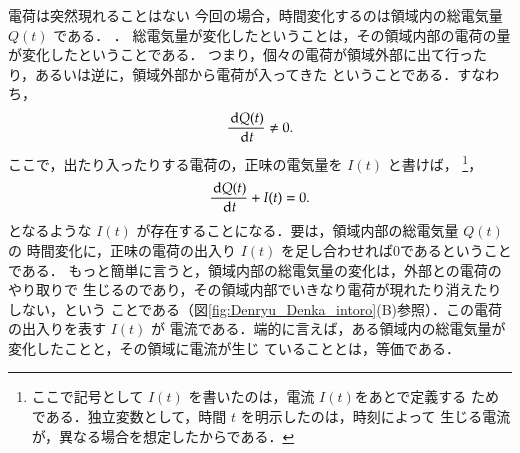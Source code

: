 \begin{mysmallsec}{電荷は突然現れることはない}
{                今回の場合，時間変化するのは領域内の総電気量 $Q(t)$ である．
            }．
        総電気量が変化したということは，その領域内部の電荷の量が変化したということである．
        つまり，個々の電荷が領域外部に出て行ったり，あるいは逆に，領域外部から電荷が入ってきた
        ということである．すなわち，
            \begin{equation*}
                \frac{\,\mathrm{d} Q(t)}{\,\mathrm{d} t} \neq 0.
            \end{equation*}
        ここで，出たり入ったりする電荷の，正味の電気量を $I(t)$ と書けば，
            \footnote{
                ここで記号として $I(t)$ を書いたのは，電流 $I(t)$をあとで定義する
                ためである．独立変数として，時間 $t$ を明示したのは，時刻によって
                生じる電流が，異なる場合を想定したからである．
            }，
            \begin{equation*}
                \frac{\,\mathrm{d} Q(t)}{\,\mathrm{d} t} + I(t) = 0.
            \end{equation*}
        となるような $I(t)$ が存在することになる．要は，領域内部の総電気量 $Q(t)$ の
        時間変化に，正味の電荷の出入り $I(t)$ を足し合わせれば0であるということである．
        もっと簡単に言うと，領域内部の総電気量の変化は，外部との電荷のやり取りで
        生じるのであり，その領域内部でいきなり電荷が現れたり消えたりしない，という
        ことである（図\ref{fig:Denryu_Denka_intoro}(B)参照）．この電荷の出入りを表す $I(t)$ が
        電流である．端的に言えば，ある領域内の総電気量が変化したことと，その領域に電流が生じ
        ていることとは，等価である．
        \end{mysmallsec}

